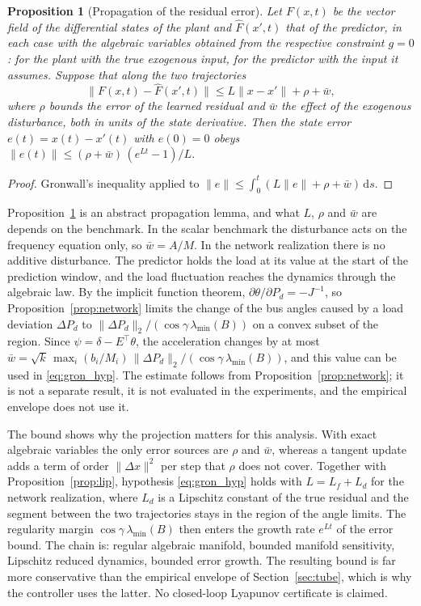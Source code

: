 \documentclass[preprint,12pt]{elsarticle}
\newtheorem{proposition}{Proposition}
\newcommand{\dd}{\mathrm{d}}
\begin{document}
\begin{proposition}[Propagation of the residual error]
\label{prop:gronwall}
Let $F(x,t)$ be the vector field of the differential states of the plant and $\hat F(x',t)$ that of the predictor, in each case with the algebraic variables obtained from the respective constraint $g=0$: for the plant with the true exogenous input, for the predictor with the input it assumes. Suppose that along the two trajectories
\begin{equation}
\|F(x,t)-\hat F(x',t)\|\le L\|x-x'\|+\rho+\bar w ,
\label{eq:gron_hyp}
\end{equation}
where $\rho$ bounds the error of the learned residual and $\bar w$ the effect of the exogenous disturbance, both in units of the state derivative. Then the state error $e(t)=x(t)-x'(t)$ with $e(0)=0$ obeys $\|e(t)\|\le(\rho+\bar w)\,(e^{Lt}-1)/L$.
\end{proposition}
\begin{proof}
Gronwall's inequality applied to $\|e\|\le\int_0^t(L\|e\|+\rho+\bar w)\,\dd s$.
\end{proof}
Proposition~\ref{prop:gronwall} is an abstract propagation lemma, and what $L$, $\rho$ and $\bar w$ are depends on the benchmark. In the scalar benchmark the disturbance acts on the frequency equation only, so $\bar w=A/M$. In the network realization there is no additive disturbance. The predictor holds the load at its value at the start of the prediction window, and the load fluctuation reaches the dynamics through the algebraic law. By the implicit function theorem, $\partial\theta/\partial P_d=-J^{-1}$, so Proposition~\ref{prop:network} limits the change of the bus angles caused by a load deviation $\Delta P_d$ to $\|\Delta P_d\|_2/(\cos\gamma\,\lambda_{\min}(B))$ on a convex subset of the region. Since $\psi=\delta-E^\top\theta$, the acceleration changes by at most $\bar w=\sqrt{k}\,\max_i(b_i/M_i)\,\|\Delta P_d\|_2/(\cos\gamma\,\lambda_{\min}(B))$, and this value can be used in \eqref{eq:gron_hyp}. The estimate follows from Proposition~\ref{prop:network}; it is not a separate result, it is not evaluated in the experiments, and the empirical envelope does not use it.

The bound shows why the projection matters for this analysis. With exact algebraic variables the only error sources are $\rho$ and $\bar w$, whereas a tangent update adds a term of order $\|\Delta x\|^2$ per step that $\rho$ does not cover. Together with Proposition~\ref{prop:lip}, hypothesis \eqref{eq:gron_hyp} holds with $L=L_f+L_d$ for the network realization, where $L_d$ is a Lipschitz constant of the true residual and the segment between the two trajectories stays in the region of the angle limits. The regularity margin $\cos\gamma\,\lambda_{\min}(B)$ then enters the growth rate $e^{Lt}$ of the error bound. The chain is: regular algebraic manifold, bounded manifold sensitivity, Lipschitz reduced dynamics, bounded error growth. The resulting bound is far more conservative than the empirical envelope of Section~\ref{sec:tube}, which is why the controller uses the latter. No closed-loop Lyapunov certificate is claimed.
\end{document}
